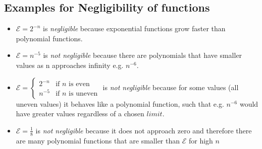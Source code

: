 \subsection*{Examples for Negligibility of functions}

\begin{itemize}
    \item $\mathcal{E} = 2^{-n}$ is \textit{negligible} because exponential functions grow faster than polynomial functions.
    \item $\mathcal{E} = n^{-5}$ is \textit{not negligible} because there are polynomials that have smaller values as n approaches infinity e.g. $n^{-6}$.
    \item $\mathcal{E} = \begin{cases}
                  2^{-n} & \text{if $n$ is even}   \\
                  n^{-5} & \text{if $n$ is uneven}
              \end{cases}$
          is \textit{not negligible} because for some values (all uneven values) it behaves like a polynomial function, such that e.g. $n^{-6}$ would have greater values regardless of a chosen $limit$.
    \item $\mathcal{E} = \frac{1}{8}$ is \textit{not negligible} because it does not approach zero and therefore there are many polynomial functions that are smaller than $\mathcal{E}$ for high $n$
\end{itemize}
